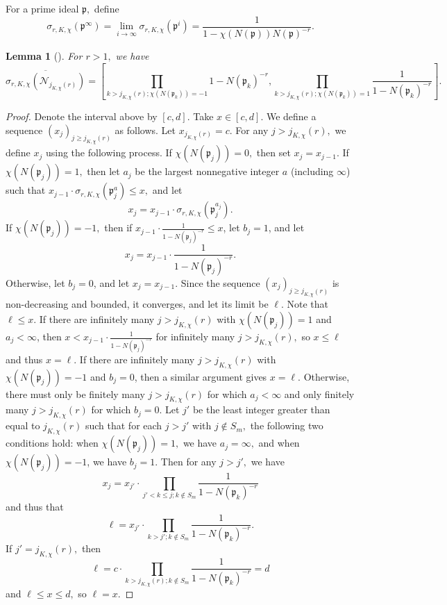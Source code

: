 \documentclass[12pt]{amsart}
\newtheorem{lemma}[theorem]{Lemma}
\theoremstyle{definition}
\numberwithin{equation}{section}
\newcommand{\p}{\mathfrak{p}}
\begin{document}

For a prime ideal $\p,$ define $$\sigma_{r,K,\chi}(\p^\infty) = \lim_{i \rightarrow \infty} \sigma_{r,K,\chi}(\p^i) = \frac{1}{1 - \chi(N(\mathfrak p)) N(\mathfrak p)^{-r}}.$$

\begin{lemma} [{\cite[Lemma 2.3]{S17}}] \label{finiteness-first-interval}
    For $r>1,$ we have $$\overline{\sigma_{r,K,\chi}( \mathcal{N}_{j_{K,\chi}(r)})} = \left[ \prod_{k > j_{K,\chi}(r); \chi(N(\p_k)) = -1} 1 - N(\p_k)^{-r}, \prod_{k > j_{K,\chi}(r); \chi(N(\p_k)) = 1} \frac{1}{1-N(\p_k)^{-r}}\right].$$
\end{lemma}

\begin{proof}
    Denote the interval above by $[c,d].$
    Take $x \in [c,d].$ We define a sequence $(x_j)_{j \geq j_{K,\chi}(r)}$ as follows. Let $x_{j_{K,\chi}(r)} = c.$ For any $j > j_{K,\chi}(r),$ we define $x_j$ using the following process.
    If $\chi(N(\p_j)) = 0,$ then set $x_j = x_{j-1}.$
    If $\chi(N(\p_j)) = 1,$ then let $a_j$ be the largest nonnegative integer $a$ (including $\infty$) such that $x_{j-1} \cdot \sigma_{r,K,\chi}(\p_j^a) \leq x,$ and let $$x_j = x_{j-1} \cdot \sigma_{r,K,\chi}(\p_j^{a_j}).$$ If $\chi(N(\p_j)) = -1,$ then if $x_{j-1} \cdot \frac{1}{1-N(\p_j)^{-r}} \leq x$, let $b_j = 1$, and let $$x_j = x_{j-1} \cdot \frac{1}{1-N(\p_j)^{-r}}.$$ Otherwise, let $b_j=0$, and let $x_j=x_{j-1}.$ Since the sequence $(x_j)_{j\geq j_{K,\chi}(r)}$ is non-decreasing and bounded, it converges, and let its limit be $\ell.$ Note that $\ell \leq x$. 
    If there are infinitely many $j > j_{K,\chi}(r)$ with $\chi(N(\p_j)) = 1$ and $a_j < \infty$, then $x < x_{j-1} \cdot \frac{1}{1 - N(\p_j)^{-r}}$ for infinitely many $j > j_{K,\chi}(r),$ so $x \leq \ell$ and thus $x = \ell.$
    If there are infinitely many $j >j_{K,\chi}(r)$ with $\chi(N(\p_j)) = -1$ and $b_j=0$, then a similar argument gives $x =\ell.$ Otherwise, there must only be finitely many $j > j_{K,\chi}(r)$ for which $a_j < \infty$ and only finitely many $j > j_{K,\chi}(r)$ for which $b_j = 0.$ 
    Let $j'$ be the least integer greater than equal to $j_{K,\chi}(r)$ such that for each $j > j'$ 
    with $j \not\in S_m,$ the following two conditions hold: when $\chi(N(\p_j)) = 1,$ we have $a_j=\infty,$ and when   $\chi(N(\p_j)) = -1$, we have $b_j = 1.$ Then for any $j > j',$ we have $$x_j = x_{j'} \cdot \prod_{j' < k \leq j; k \not\in S_m} \frac{1}{1-N(\p_k)^{-r}}$$ and thus that $$\ell = x_{j'} \cdot \prod_{k > j'; k \not\in S_m} \frac{1}{1-N(\p_k)^{-r}}.$$ If $j' = j_{K,\chi}(r),$ then $$\ell = c \cdot \prod_{k > j_{K,\chi}(r); k \not\in S_m} \frac{1}{1-N(\p_k)^{-r}} = d$$ and $\ell \leq x \leq d,$ so $\ell = x.$

\end{proof}
\end{document}
